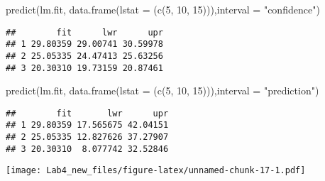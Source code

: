 \documentclass[
]{article}
\newenvironment{Shaded}{\begin{snugshade}}{\end{snugshade}}
\newcommand{\AttributeTok}[1]{\textcolor[rgb]{0.77,0.63,0.00}{#1}}
\newcommand{\DecValTok}[1]{\textcolor[rgb]{0.00,0.00,0.81}{#1}}
\newcommand{\FunctionTok}[1]{\textcolor[rgb]{0.00,0.00,0.00}{#1}}
\newcommand{\NormalTok}[1]{#1}
\newcommand{\SpecialCharTok}[1]{\textcolor[rgb]{0.00,0.00,0.00}{#1}}
\newcommand{\StringTok}[1]{\textcolor[rgb]{0.31,0.60,0.02}{#1}}
\begin{document}
\begin{Shaded}
\begin{Highlighting}[]
\FunctionTok{predict}\NormalTok{(lm.fit, }\FunctionTok{data.frame}\NormalTok{(}\AttributeTok{lstat =}\NormalTok{ (}\FunctionTok{c}\NormalTok{(}\DecValTok{5}\NormalTok{, }\DecValTok{10}\NormalTok{, }\DecValTok{15}\NormalTok{))),}\AttributeTok{interval =} \StringTok{"confidence"}\NormalTok{)}
\end{Highlighting}
\end{Shaded}

\begin{verbatim}
##        fit      lwr      upr
## 1 29.80359 29.00741 30.59978
## 2 25.05335 24.47413 25.63256
## 3 20.30310 19.73159 20.87461
\end{verbatim}

\begin{Shaded}
\begin{Highlighting}[]
\FunctionTok{predict}\NormalTok{(lm.fit, }\FunctionTok{data.frame}\NormalTok{(}\AttributeTok{lstat =}\NormalTok{ (}\FunctionTok{c}\NormalTok{(}\DecValTok{5}\NormalTok{, }\DecValTok{10}\NormalTok{, }\DecValTok{15}\NormalTok{))),}\AttributeTok{interval =} \StringTok{"prediction"}\NormalTok{)}
\end{Highlighting}
\end{Shaded}

\begin{verbatim}
##        fit       lwr      upr
## 1 29.80359 17.565675 42.04151
## 2 25.05335 12.827626 37.27907
## 3 20.30310  8.077742 32.52846
\end{verbatim}

\begin{Shaded}
\end{Shaded}

\texttt{[image: Lab4\_new\_files/figure-latex/unnamed-chunk-17-1.pdf]}

\begin{Shaded}
\end{Shaded}
\end{document}
